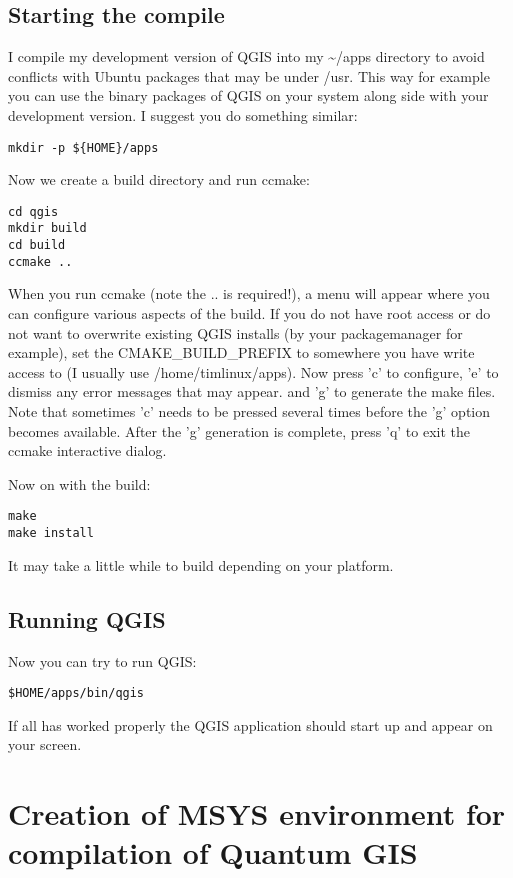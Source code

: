 \subsection{Starting the compile}
I compile my development version of QGIS into my \~{}/apps directory to avoid
conflicts with Ubuntu packages that may be under /usr. This way for example
you can use the binary packages of QGIS on your system along side with your
development version. I suggest you do something similar:

\begin{verbatim}
mkdir -p ${HOME}/apps 
\end{verbatim}

Now we create a build directory and run ccmake:

\begin{verbatim}
cd qgis
mkdir build
cd build
ccmake ..
\end{verbatim}

When you run ccmake (note the .. is required!), a menu will appear where 
you can configure various aspects of the build. If you do not have root
access or do not want to overwrite existing QGIS installs (by your
packagemanager for example), set the CMAKE\_BUILD\_PREFIX to somewhere you
have write access to (I usually use /home/timlinux/apps). Now press
'c' to configure, 'e' to dismiss any error messages that may appear.
and 'g' to generate the make files. Note that sometimes 'c' needs to 
be pressed several times before the 'g' option becomes available.
After the 'g' generation is complete, press 'q' to exit the ccmake 
interactive dialog.

Now on with the build:

\begin{verbatim}
make
make install
\end{verbatim}

It may take a little while to build depending on your platform.

\subsection{Running QGIS}
Now you can try to run QGIS:

\begin{verbatim}
$HOME/apps/bin/qgis 
\end{verbatim}

If all has worked properly the QGIS application should start up and appear
on your screen.


\section{Creation of MSYS environment for compilation of Quantum GIS}
